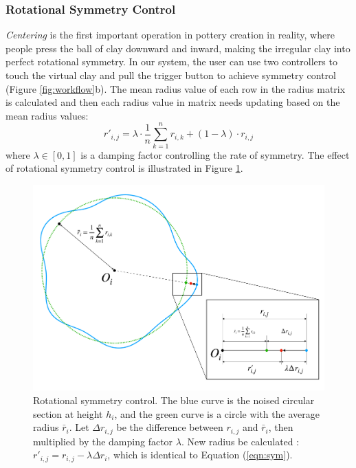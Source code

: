 \documentclass{svjour3}                     %
\begin{document}
\subsubsection{Rotational Symmetry Control}
\label{sec:rotational}
\textit{Centering} is the first important operation in pottery creation in reality, where people press the ball of clay downward and inward, making the irregular clay into perfect rotational symmetry.
In our system, the user can use two controllers to touch the virtual clay and pull the trigger button to achieve symmetry control (Figure \ref{fig:workflow}b).
The mean radius value of each row in the radius matrix is calculated and then each radius value in matrix needs updating based on the mean radius values:
\begin{equation}
\label{eqn:sym}
r'_{i,j} = 
\lambda \cdot \frac{1}{n}\sum_{k=1}^{n} r_{i,k}
+ (1 - \lambda) \cdot r_{i,j}
\end{equation}
where $\lambda \in [0,1]$ is a damping factor controlling the rate of symmetry.
The effect of rotational symmetry control is illustrated in Figure \ref{fig:symmetry}.

\begin{figure}
\includegraphics[width=\textwidth]{fig7.pdf}
\caption{Rotational symmetry control. The blue curve is the noised circular section at height $h_{i}$, and the green curve is a circle with the average radius $\bar r_{i}$. Let $\Delta r_{i,j}$ be the difference between $r_{i,j}$ and $\bar r_{i}$, then multiplied by the damping factor $\lambda$. New radius be calculated : $r'_{i, j} = r_{i,j} - \lambda\Delta r_{i}$, which is identical to Equation (\ref{eqn:sym}). }
\label{fig:symmetry}
\end{figure}
\end{document}
